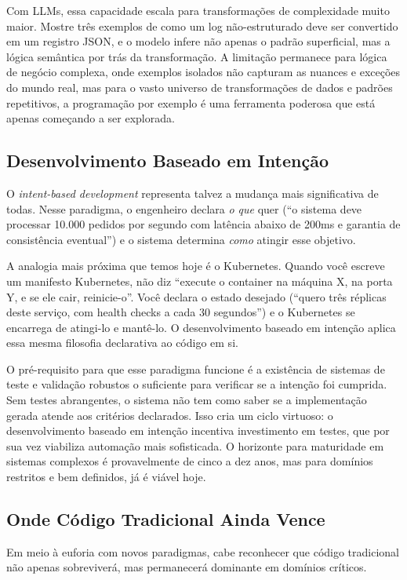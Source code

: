 Com LLMs, essa capacidade escala para transformações de complexidade muito maior. Mostre três exemplos de como um log não-estruturado deve ser convertido em um registro JSON, e o modelo infere não apenas o padrão superficial, mas a lógica semântica por trás da transformação. A limitação permanece para lógica de negócio complexa, onde exemplos isolados não capturam as nuances e exceções do mundo real, mas para o vasto universo de transformações de dados e padrões repetitivos, a programação por exemplo é uma ferramenta poderosa que está apenas começando a ser explorada.

\subsection{Desenvolvimento Baseado em Intenção}

O \textit{intent-based development} representa talvez a mudança mais significativa de todas. Nesse paradigma, o engenheiro declara \textit{o que} quer (``o sistema deve processar 10.000 pedidos por segundo com latência abaixo de 200ms e garantia de consistência eventual'') e o sistema determina \textit{como} atingir esse objetivo.

A analogia mais próxima que temos hoje é o Kubernetes. Quando você escreve um manifesto Kubernetes, não diz ``execute o container na máquina X, na porta Y, e se ele cair, reinicie-o''. Você declara o estado desejado (``quero três réplicas deste serviço, com health checks a cada 30 segundos'') e o Kubernetes se encarrega de atingi-lo e mantê-lo. O desenvolvimento baseado em intenção aplica essa mesma filosofia declarativa ao código em si.

O pré-requisito para que esse paradigma funcione é a existência de sistemas de teste e validação robustos o suficiente para verificar se a intenção foi cumprida. Sem testes abrangentes, o sistema não tem como saber se a implementação gerada atende aos critérios declarados. Isso cria um ciclo virtuoso: o desenvolvimento baseado em intenção incentiva investimento em testes, que por sua vez viabiliza automação mais sofisticada. O horizonte para maturidade em sistemas complexos é provavelmente de cinco a dez anos, mas para domínios restritos e bem definidos, já é viável hoje.

\subsection{Onde Código Tradicional Ainda Vence}

Em meio à euforia com novos paradigmas, cabe reconhecer que código tradicional não apenas sobreviverá, mas permanecerá dominante em domínios críticos.

